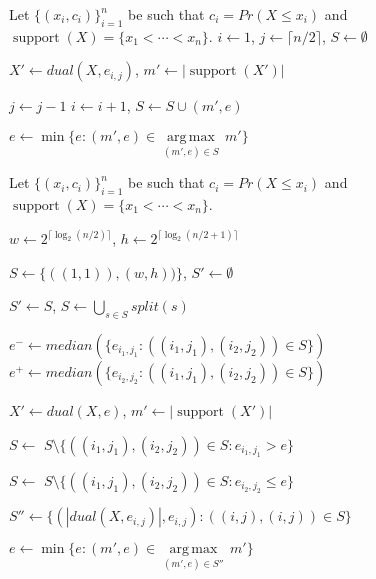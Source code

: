 \documentclass[letterpaper]{article} %
\DeclareMathOperator{\supp}{support}
\begin{document}
\begin{algorithm}
	\DontPrintSemicolon
	Let $\{(x_i, c_i)\}_{i=1}^n$ be such that $c_i=Pr(X \leq x_i)$ and $\supp(X)=\{x_1 < \cdots < x_n\}$.\;
    $i \gets 1$, $j \gets \lceil n/2 \rceil$, $S \gets \emptyset$\;

	{
		
		
		$X' \gets dual(X,e_{i,j})$, $m' \gets |\supp(X')|$\;
	
		{
			$j \gets j - 1$
		}
		 {
			$i \gets i + 1$, $S \gets S \cup (m',e)$			
		}
	}
	$e \gets \min\{e\colon (m',e) \in \underset{(m',e)\in S}{\operatorname{arg\,max}}\, m'\}$\;
	
	\caption{$saddlebackApprox(X,m)$}   
	\label{alg:saddleback}
\end{algorithm}


\begin{algorithm}
		\DontPrintSemicolon
		Let $\{(x_i, c_i)\}_{i=1}^n$ be such that $c_i=Pr(X \leq x_i)$ and $\supp(X)=\{x_1 < \cdots < x_n\}$.\;
		
		$w \gets 2^{\lceil \log_2(n/2) \rceil}$,
		$h \gets 2^{\lceil \log_2(n/2+1) \rceil}$ \;
				
		$S \gets  \{ ((1, 1)),(w,h)) \}$, $S' \gets \emptyset$\;
		
		
		{
			$S' \gets S$,
			$S \gets  \bigcup_{s \in S} split(s)$\;
			
			$e^- {\gets} median(\{ e_{i_1,j_1} \colon ((i_1,j_1),(i_2,j_2)) \in S \}) $\;		
			$e^+ {\gets} median(\{ e_{i_2,j_2} \colon ((i_1,j_1),(i_2,j_2)) \in S \}) $\;			

			 {
				$X' \gets dual(X,e)$, $m' \gets |\supp(X')|$\;
	
				 {
					$S \gets$ $S \setminus \{ ((i_1,j_1),(i_2,j_2)) \in S \colon e_{i_1,j_1} > e \}$ \;
				}
			
				\Else %
				{
					$S \gets$ $S \setminus \{ ((i_1,j_1),(i_2,j_2)) \in S \colon e_{i_2,j_2} \leq e \}$ \;
				}
			}
		}
	
		$S'' \gets \{(|dual(X,e_{i,j})|,e_{i,j}) \colon ((i,j),(i,j)) \in S\}$\;	
	
		$e \gets \min\{e\colon (m',e) \in \underset{(m',e)\in S''}{\operatorname{arg\,max}}\, m'\}$\;

		\caption{$linApprox(X,m)$}   
		\label{alg:linear}
	\end{algorithm}
\end{document}
